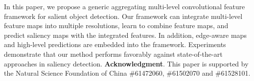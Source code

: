 \documentclass[10pt,twocolumn,letterpaper]{article}
\begin{document}
In this paper, we propose a generic aggregating multi-level convolutional feature framework for salient object detection.
%
Our framework can integrate multi-level feature maps into multiple resolutions, learn to combine feature maps, and predict saliency maps with the integrated features.
%
In addition, edge-aware maps and high-level predictions are embedded into the framework.
%
%
Experiments demonstrate that our method performs favorably against state-of-the-art approaches in saliency detection.
\vspace{-2mm}
{\small {\flushleft\textbf{Acknowledgment}}.
This paper is supported by the Natural Science Foundation of China \#61472060, \#61502070 and \#61528101.}
\vspace{-5mm}
{\small


}
\end{document}
